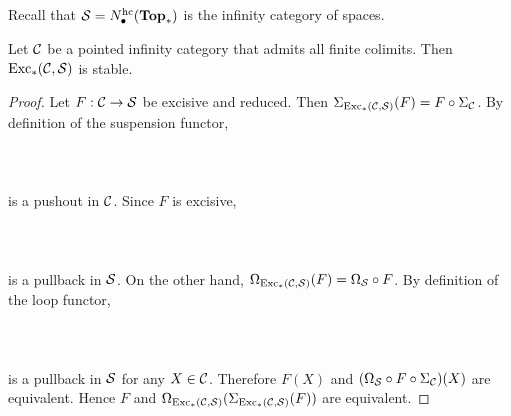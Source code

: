 \documentclass[a4paper]{article}
\begin{document}
\subsection{}
Recall that $\mathcal{S}=N_\bullet^{\text{hc}}(\bold{Top}_\ast)$ is the infinity category of spaces. 

\begin{prp}{}{} Let $\mathcal{C}$ be a pointed infinity category that admits all finite colimits. Then $\text{Exc}_\ast(\mathcal{C},\mathcal{S})$ is stable. \tcbline
\begin{proof}
Let $F:\mathcal{C}\to\mathcal{S}$ be excisive and reduced. Then $\Sigma_{\text{Exc}_\ast(\mathcal{C},\mathcal{S})}(F)=F\circ\Sigma_{\mathcal{C}}$. By definition of the suspension functor, \\~\\
\\~\\
is a pushout in $\mathcal{C}$. Since $F$ is excisive, \\~\\
\\~\\
is a pullback in $\mathcal{S}$. On the other hand, $\Omega_{\text{Exc}_\ast(\mathcal{C},\mathcal{S})}(F)=\Omega_{\mathcal{S}}\circ F$. By definition of the loop functor, \\~\\
\\~\\
is a pullback in $\mathcal{S}$ for any $X\in\mathcal{C}$. Therefore $F(X)$ and $(\Omega_{\mathcal{S}}\circ F\circ\Sigma_{\mathcal{C}})(X)$ are equivalent. Hence $F$ and $\Omega_{\text{Exc}_\ast(\mathcal{C},\mathcal{S})}(\Sigma_{\text{Exc}_\ast(\mathcal{C},\mathcal{S})}(F))$ are equivalent. 
\end{proof}
\end{prp}
\end{document}
